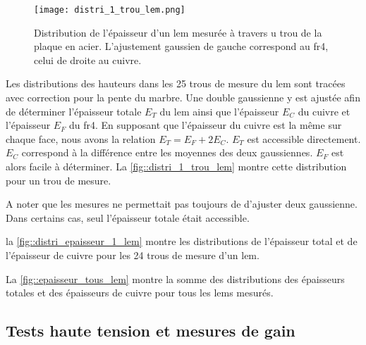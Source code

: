                 \begin{wrapfigure}{r}{0.4\textwidth}
                    \texttt{[image: distri\_1\_trou\_lem.png]}
                    \caption[Distribution de l'épaisseur d'un \gls{lem} mesurée à travers u trou de la plaque en acier.]{Distribution de l'épaisseur d'un \gls{lem} mesurée à travers u trou de la plaque en acier. L'ajustement gaussien de gauche correspond au \gls{fr4}, celui de droite au cuivre.}
                    \label{fig::distri_1_trou_lem}
                \end{wrapfigure}
                Les distributions des hauteurs dans les 25 trous de mesure du \gls{lem} sont tracées avec correction pour la pente du marbre. Une double gaussienne y est ajustée afin de déterminer l'épaisseur totale $E_T$ du \gls{lem} ainsi que l'épaisseur $E_C$ du cuivre et l'épaisseur $E_F$ du \gls{fr4}. En supposant que l'épaisseur du cuivre est la même sur chaque face, nous avons la relation $E_T = E_F + 2E_C$. $E_T$ est accessible directement. $E_C$ correspond à la différence entre les moyennes des deux gaussiennes. $E_F$ est alors facile à déterminer. La \autoref{fig::distri_1_trou_lem} montre cette distribution pour un trou de mesure. 
                
                A noter que les mesures ne permettait pas toujours de d'ajuster deux gaussienne. Dans certains cas, seul l'épaisseur totale était accessible.
                
                la \autoref{fig::distri_epaisseur_1_lem} montre les distributions de l'épaisseur total et de l'épaisseur de cuivre pour les 24 trous de mesure d'un \gls{lem}.
                
                La \autoref{fig::epaisseur_tous_lem} montre la somme des distributions des épaisseurs totales et des épaisseurs de cuivre pour tous les \glspl{lem} mesurés.
                
        
        \subsection{Tests haute tension et mesures de gain}\label{sec::test_HT}
        
